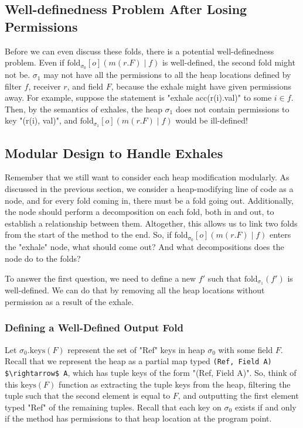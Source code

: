 \documentclass[msc,oneside]{ubcthesis}
\theoremstyle{definition}
\begin{document}
\subsection{Well-definedness Problem After Losing Permissions}
Before we can even discuss these folds, there is a potential well-definedness problem. Even if $\textrm{fold}_{\sigma_0}[o]( m(r.F) \mid f)$ is well-defined, the second fold might not be. $\sigma_1$ may not have all the permissions to all the heap locations defined by filter $f$, receiver $r$, and field $F$, because the exhale might have given permissions away. For example, suppose the statement is "exhale acc(r(i).val)" to some $i \in f$. Then, by the semantics of exhales, the heap $\sigma_1$ does not contain permissions to key "(r(i), val)", and $\textrm{fold}_{\sigma_1}[o]( m(r.F) \mid f)$ would be ill-defined!

\subsection{Modular Design to Handle Exhales}
Remember that we still want to consider each heap modification modularly. As discussed in the previous section, we consider a heap-modifying line of code as a node, and for every fold coming in, there must be a fold going out. Additionally, the node should perform a decomposition on each fold, both in and out, to establish a relationship between them. Altogether, this allows us to link two folds from the start of the method to the end. So, if $\textrm{fold}_{\sigma_0}[o]( m(r.F) \mid f)$ enters the "exhale" node, what should come out? And what decompositions does the node do to the folds?

To answer the first question, we need to define a new $f'$ such that $\textrm{fold}_{\sigma_1}(f')$ is well-defined. We can do that by removing all the heap locations without permission as a result of the exhale. 

\subsubsection{Defining a Well-Defined Output Fold}
Let $\sigma_0.\textrm{keys}(F)$ represent the set of "Ref" keys in heap $\sigma_0$ with some field $F$. Recall that we represent the heap as a partial map typed \lstinline{(Ref, Field A) $\rightarrow$ A}, which has tuple keys of the form "(Ref, Field A)". So, think of this $\textrm{keys}(F)$ function as extracting the tuple keys from the heap, filtering the tuple such that the second element is equal to $F$, and outputting the first element typed "Ref" of the remaining tuples. Recall that each key on $\sigma_0$ exists if and only if the method has permissions to that heap location at the program point.
\end{document}
